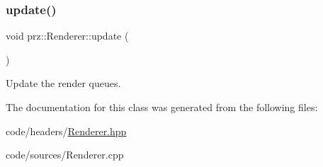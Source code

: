 \subsubsection{\texorpdfstring{update()}{update()}}
{\footnotesize\ttfamily void prz\+::\+Renderer\+::update (\begin{DoxyParamCaption}{ }\end{DoxyParamCaption})\hspace{0.3cm}{\ttfamily [inline]}}



Update the render queues. 



The documentation for this class was generated from the following files\+:\begin{DoxyCompactItemize}
\item 
code/headers/\mbox{\hyperlink{_renderer_8hpp}{Renderer.\+hpp}}\item 
code/sources/Renderer.\+cpp\end{DoxyCompactItemize}
